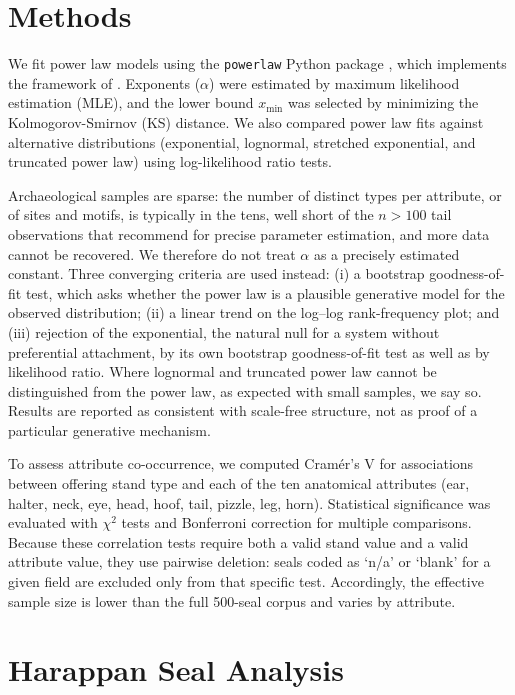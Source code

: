 \documentclass[12pt]{article}
\begin{document}
\section{Methods}

We fit power law models using the \texttt{powerlaw} Python package
\citep{alstott2014powerlaw}, which implements the framework of
\citet{clauset2009power}. Exponents ($\alpha$) were estimated by maximum
likelihood estimation (MLE), and the lower bound $x_{\min}$ was selected by
minimizing the Kolmogorov-Smirnov (KS) distance. We also compared power law
fits against alternative distributions (exponential, lognormal, stretched
exponential, and truncated power law) using log-likelihood ratio tests.

Archaeological samples are sparse: the number of distinct types per attribute,
or of sites and motifs, is typically in the tens, well short of the
$n > 100$ tail observations that \citet{clauset2009power} recommend for precise
parameter estimation, and more data cannot be recovered. We therefore do not
treat $\alpha$ as a precisely estimated constant. Three converging criteria are
used instead: (i) a bootstrap goodness-of-fit test, which asks whether the power
law is a plausible generative model for the observed distribution; (ii) a
linear trend on the log--log rank-frequency plot; and (iii) rejection of the
exponential, the natural null for a system without preferential
attachment, by its own bootstrap goodness-of-fit test as well as by likelihood
ratio. Where lognormal and truncated power law cannot be distinguished from the
power law, as expected with small samples, we say so. Results are reported as
consistent with scale-free structure, not as proof of a particular generative
mechanism.

To assess attribute co-occurrence, we computed Cram{\'e}r's V for associations
between offering stand type and each of the ten anatomical attributes (ear,
halter, neck, eye, head, hoof, tail, pizzle, leg, horn). Statistical
significance was evaluated with $\chi^2$ tests and Bonferroni correction for
multiple comparisons. Because these correlation tests require both a valid stand
value and a valid attribute value, they use pairwise deletion: seals coded as
`n/a' or `blank' for a given field are excluded only from that specific test.
Accordingly, the effective sample size is lower than the full 500-seal corpus
and varies by attribute.

\section{Harappan Seal Analysis}
\end{document}
